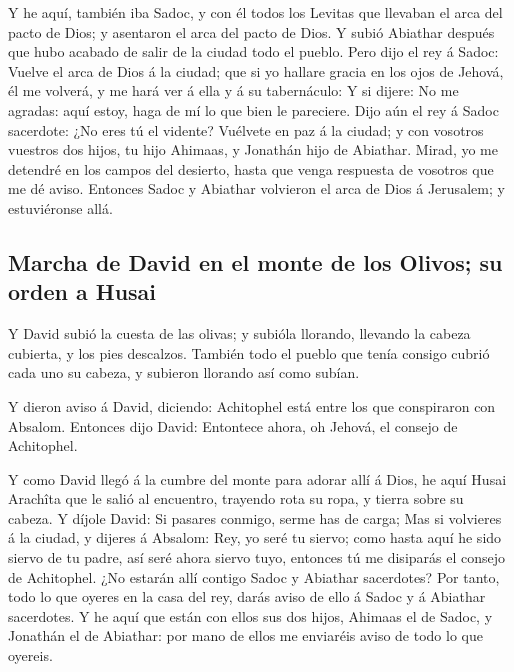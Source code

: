  Y he aquí, también iba Sadoc, y con él todos los Levitas
que llevaban el arca del pacto de Dios; y asentaron el arca del pacto de
Dios. Y subió Abiathar después que hubo acabado de salir de la ciudad
todo el pueblo.  Pero dijo el rey á Sadoc: Vuelve el arca
de Dios á la ciudad; que si yo hallare gracia en los ojos de Jehová, él
me volverá, y me hará ver á ella y á su tabernáculo:  Y
si dijere: No me agradas: aquí estoy, haga de mí lo que bien le
pareciere.  Dijo aún el rey á Sadoc sacerdote: ¿No eres
tú el vidente? Vuélvete en paz á la ciudad; y con vosotros vuestros dos
hijos, tu hijo Ahimaas, y Jonathán hijo de Abiathar. 
Mirad, yo me detendré en los campos del desierto, hasta que venga
respuesta de vosotros que me dé aviso.  Entonces Sadoc y
Abiathar volvieron el arca de Dios á Jerusalem; y estuviéronse allá.

\hypertarget{marcha-de-david-en-el-monte-de-los-olivos-su-orden-a-husai}{%
\subsection{Marcha de David en el monte de los Olivos; su orden a
Husai}\label{marcha-de-david-en-el-monte-de-los-olivos-su-orden-a-husai}}

 Y David subió la cuesta de las olivas; y subióla
llorando, llevando la cabeza cubierta, y los pies descalzos. También
todo el pueblo que tenía consigo cubrió cada uno su cabeza, y subieron
llorando así como subían.

 Y dieron aviso á David, diciendo: Achitophel está entre
los que conspiraron con Absalom. Entonces dijo David: Entontece ahora,
oh Jehová, el consejo de Achitophel.

 Y como David llegó á la cumbre del monte para adorar
allí á Dios, he aquí Husai Arachîta que le salió al encuentro, trayendo
rota su ropa, y tierra sobre su cabeza.  Y díjole David:
Si pasares conmigo, serme has de carga;  Mas si volvieres
á la ciudad, y dijeres á Absalom: Rey, yo seré tu siervo; como hasta
aquí he sido siervo de tu padre, así seré ahora siervo tuyo, entonces tú
me disiparás el consejo de Achitophel.  ¿No estarán allí
contigo Sadoc y Abiathar sacerdotes? Por tanto, todo lo que oyeres en la
casa del rey, darás aviso de ello á Sadoc y á Abiathar sacerdotes.
 Y he aquí que están con ellos sus dos hijos, Ahimaas el
de Sadoc, y Jonathán el de Abiathar: por mano de ellos me enviaréis
aviso de todo lo que oyereis.

